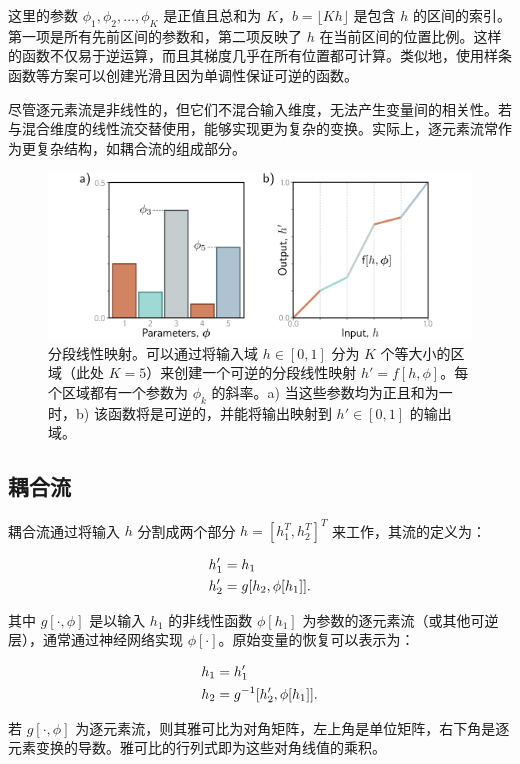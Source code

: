 这里的参数 \(\phi_1, \phi_2, ..., \phi_K\) 是正值且总和为 \(K\)，\(b = \lfloor Kh \rfloor\) 是包含 \(h\) 的区间的索引。第一项是所有先前区间的参数和，第二项反映了 \(h\) 在当前区间的位置比例。这样的函数不仅易于逆运算，而且其梯度几乎在所有位置都可计算。类似地，使用样条函数等方案可以创建光滑且因为单调性保证可逆的函数。

尽管逐元素流是非线性的，但它们不混合输入维度，无法产生变量间的相关性。若与混合维度的线性流交替使用，能够实现更为复杂的变换。实际上，逐元素流常作为更复杂结构，如耦合流的组成部分。

\begin{figure}[ht!]
\centering
\includegraphics[width=0.7\linewidth]{png/chapter16/FlowPiecewiseLinear.png}
\caption{分段线性映射。可以通过将输入域 \( h \in [0, 1] \) 分为 \( K \) 个等大小的区域（此处 \( K = 5 \)）来创建一个可逆的分段线性映射 \( h' = f[h, \phi] \)。每个区域都有一个参数为 \( \phi_k \) 的斜率。a) 当这些参数均为正且和为一时，b) 该函数将是可逆的，并能将输出映射到 \( h' \in [0, 1] \) 的输出域。}
\end{figure}


\subsection{耦合流}
耦合流通过将输入 \(h\) 分割成两个部分 \(h = [h_1^T, h_2^T]^T\) 来工作，其流的定义为：

\begin{align}
&h_1' = h_1 \notag \\
&h_2' = g[h_2, \phi[h_1]]. 
\end{align} 


其中 \(g[\cdot, \phi]\) 是以输入 \(h_1\) 的非线性函数 \(\phi[h_1]\) 为参数的逐元素流（或其他可逆层），通常通过神经网络实现 \(\phi[\cdot]\)。原始变量的恢复可以表示为：


\begin{align}
&h_1 = h_1' \notag \\
&h_2 = g^{-1}[h_2', \phi[h_1]]. 
\end{align} 


若 \(g[\cdot, \phi]\) 为逐元素流，则其雅可比为对角矩阵，左上角是单位矩阵，右下角是逐元素变换的导数。雅可比的行列式即为这些对角线值的乘积。

